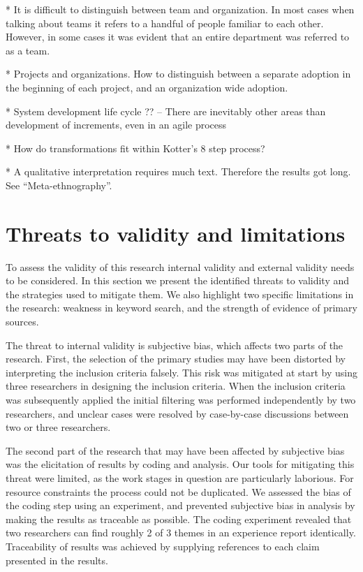 
* It is difficult to distinguish between team and organization. In most cases
  when talking about teams it refers to a handful of people familiar to each
  other. However, in some cases it was evident that an entire department was
  referred to as a team.

* Projects and organizations. How to distinguish between a separate adoption in
  the beginning of each project, and an organization wide adoption.


* System development life cycle ?? -- There are inevitably other areas than
  development of increments, even in an agile process

* How do transformations fit within Kotter's 8 step process?

* A qualitative interpretation requires much text. Therefore the results got
  long. See ``Meta-ethnography''.

\section{Threats to validity and limitations}

To assess the validity of this research internal validity and external validity
needs to be considered. In this section we present the identified threats to
validity and the strategies used to mitigate them. We also highlight two
specific limitations in the research: weakness in keyword search, and the
strength of evidence of primary sources.

The threat to internal validity is subjective bias, which affects two parts of
the research. First, the selection of the primary studies may have been
distorted by interpreting the inclusion criteria falsely. This risk was
mitigated at start by using three researchers in designing the inclusion
criteria. When the inclusion criteria was subsequently applied the initial
filtering was performed independently by two researchers, and unclear cases were
resolved by case-by-case discussions between two or three researchers.

The second part of the research that may have been affected by subjective bias
was the elicitation of results by coding and analysis. Our tools for mitigating
this threat were limited, as the work stages in question are particularly
laborious. For resource constraints the process could not be duplicated. We
assessed the bias of the coding step using an experiment, and prevented
subjective bias in analysis by making the results as traceable as possible. The
coding experiment revealed that two researchers can find roughly 2 of 3 themes
in an experience report identically. Traceability of results was achieved by
supplying references to each claim presented in the results.

